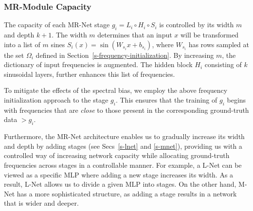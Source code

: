 


\subsubsection{MR-Module Capacity}
\label{sec-module-capacity}

The capacity of each MR-Net stage $g_i=L_i\circ H_i\circ S_i$ is controlled by its width $m$ and depth $k+1$.
The width $m$ determines that an input $x$ will be transformed into a list of $m$ sines $S_i(x)=\sin\left(W_{s_i}x+b_{s_i}\right)$,
where $W_{s_i}$ has rows sampled at the set $\Omega_i$ defined in Section~\ref{s-frequency-initialization}. By increasing $m$, the dictionary of input frequencies is augmented. The hidden block $H_i$ consisting of $k$ sinusoidal layers, further enhances this list of frequencies.


To mitigate the effects of the spectral bias, we employ the above frequency initialization approach to the stage $g_i$. This ensures that the training of $g_i$ begins with frequencies that are \textit{close} to those present in the corresponding ground-truth data $\gt{g}_i$.

Furthermore, the MR-Net architecture enables us to gradually increase its width and depth by adding stages (see Secs~\ref{s-lnet} and \ref{s-mnet}), providing us with a controlled way of increasing network capacity while allocating ground-truth frequencies across stages in a controllable manner.
For example, a L-Net can be viewed as a specific MLP where adding a new stage increases its width. As a result, L-Net allows us to divide a given MLP into stages. On the other hand, M-Net has a more sophisticated structure, as adding a stage results in a network that is wider and deeper.


